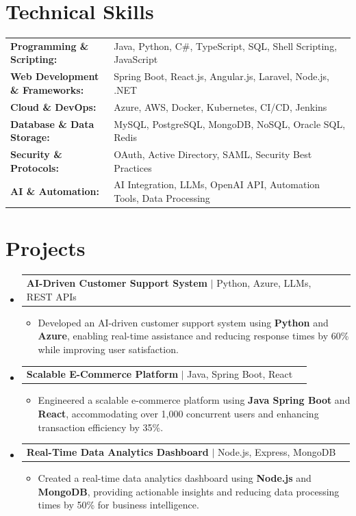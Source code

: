 \documentclass[letterpaper,10pt]{article}
\makeatletter
\newcommand{\resumeItem}[1]{
  \item{\fontsize{8pt}{9pt}\selectfont
    #1 \vspace{-3pt}
  }
}
\newcommand{\resumeProjectHeading}[2]{
    \item
    \begin{tabular*}{1.001\textwidth}{l@{\extracolsep{\fill}}r}
      \fontsize{8.5pt}{10pt}#1 & \textbf{\fontsize{8.5pt}{10pt} #2}\\
    \end{tabular*}\vspace{-7pt}
}
\newcommand{\resumeSubHeadingListStart}{\begin{itemize}[leftmargin=0pt, label={}]}
\newcommand{\resumeSubHeadingListEnd}{\end{itemize}}
\newcommand{\resumeItemListStart}{\begin{itemize}[leftmargin=*]}
\newcommand{\resumeItemListEnd}{\end{itemize}\vspace{-5pt}}
\makeatother
\begin{document}
\section{Technical Skills}
        \vspace{-14pt}
        \begin{table}[h]
            \fontsize{8pt}{9pt}\selectfont
            \begin{tabular}{p{0.3\linewidth} p{0.7\linewidth}}
                \textbf{Programming \& Scripting:} & Java, Python, C\#, TypeScript, SQL, Shell Scripting, JavaScript \\
                \textbf{Web Development \& Frameworks:} & Spring Boot, React.js, Angular.js, Laravel, Node.js, .NET \\
                \textbf{Cloud \& DevOps:} & Azure, AWS, Docker, Kubernetes, CI/CD, Jenkins \\
                \textbf{Database \& Data Storage:} & MySQL, PostgreSQL, MongoDB, NoSQL, Oracle SQL, Redis \\
                \textbf{Security \& Protocols:} & OAuth, Active Directory, SAML, Security Best Practices \\
                \textbf{AI \& Automation:} & AI Integration, LLMs, OpenAI API, Automation Tools, Data Processing \\
            \end{tabular}
        \end{table}
 \vspace{-18pt}

\section{Projects}
    \vspace{-5pt}
    \resumeSubHeadingListStart
          \resumeProjectHeading
            {\textbf{AI-Driven Customer Support System} $|$ Python, Azure, LLMs, REST APIs}{}
            \resumeItemListStart
                \resumeItem{Developed an AI-driven customer support system using \textbf{Python} and \textbf{Azure}, enabling real-time assistance and reducing response times by 60\% while improving user satisfaction.}
            \resumeItemListEnd
        \vspace{-12pt}
    
        \resumeProjectHeading
            {\textbf{Scalable E-Commerce Platform} $|$ Java, Spring Boot, React}{}
        \resumeItemListStart
                \resumeItem{Engineered a scalable e-commerce platform using \textbf{Java Spring Boot} and \textbf{React}, accommodating over 1,000 concurrent users and enhancing transaction efficiency by 35\%.}
        \resumeItemListEnd
      \vspace{-12pt}
      \resumeProjectHeading
        {\textbf{Real-Time Data Analytics Dashboard} $|$ Node.js, Express, MongoDB}{}
    \resumeItemListStart
            \resumeItem{Created a real-time data analytics dashboard using \textbf{Node.js} and \textbf{MongoDB}, providing actionable insights and reducing data processing times by 50\% for business intelligence.}
    \resumeItemListEnd
    \resumeSubHeadingListEnd
\end{document}
